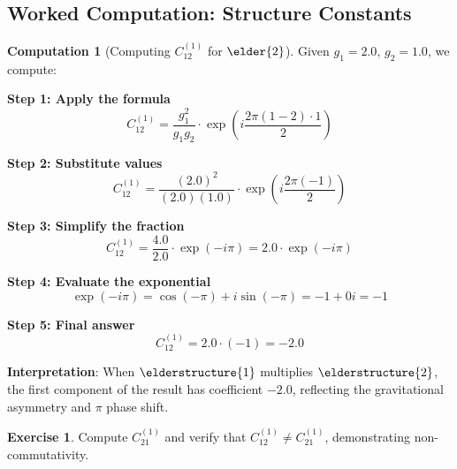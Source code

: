 \documentclass[12pt,a4paper]{article}
\theoremstyle{definition}
\newtheorem{exercise}{Exercise}[section]
\newtheorem{computation}{Computation}[section]
\theoremstyle{remark}
\begin{document}
\subsection{Worked Computation: Structure Constants}

\begin{computation}[Computing $C_{12}^{(1)}$ for $\elder{2}$]
Given $g_1 = 2.0$, $g_2 = 1.0$, we compute:

\textbf{Step 1: Apply the formula}
$$C_{12}^{(1)} = \frac{g_1^2}{g_1 g_2} \cdot \exp\left(i\frac{2\pi(1-2) \cdot 1}{2}\right)$$

\textbf{Step 2: Substitute values}
$$C_{12}^{(1)} = \frac{(2.0)^2}{(2.0)(1.0)} \cdot \exp\left(i\frac{2\pi(-1)}{2}\right)$$

\textbf{Step 3: Simplify the fraction}
$$C_{12}^{(1)} = \frac{4.0}{2.0} \cdot \exp\left(-i\pi\right) = 2.0 \cdot \exp(-i\pi)$$

\textbf{Step 4: Evaluate the exponential}
$$\exp(-i\pi) = \cos(-\pi) + i\sin(-\pi) = -1 + 0i = -1$$

\textbf{Step 5: Final answer}
$$C_{12}^{(1)} = 2.0 \cdot (-1) = -2.0$$

\textbf{Interpretation}: When $\elderstructure{1}$ multiplies $\elderstructure{2}$, the first component of the result has coefficient $-2.0$, reflecting the gravitational asymmetry and $\pi$ phase shift.
\end{computation}

\begin{exercise}
Compute $C_{21}^{(1)}$ and verify that $C_{12}^{(1)} \neq C_{21}^{(1)}$, demonstrating non-commutativity.
\end{exercise}
\end{document}
